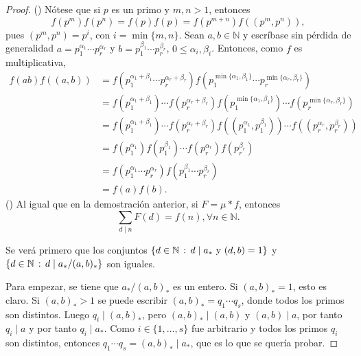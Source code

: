 \begin{proof}
(\textsc{}) Nótese que si $p$ es un primo y $m,n > 1$, entonces
\begin{equation*}
    f(p^m)f(p^n) = f(p) f(p) = f(p^{m+n})f((p^m,p^n)),
\end{equation*}
pues $(p^m,p^n)=p^i$, con $i=\min \{ m,n \}$. Sean $a,b \in \mathbb{N}$ y escríbase sin pérdida de generalidad $a=p_1^{\alpha_1} \cdots p_r^{\alpha_r}$ y $b=p_1^{\beta_1} \cdots p_r^{\beta_r}$, $0 \le \alpha_i, \beta_i$. Entonces, como $f$ es multiplicativa,
\begin{align*}
    f(a b)f((a,b)) &= f(p_1^{\alpha_1+\beta_1} \cdots p_r^{\alpha_r+\beta_r}) f(p_1^{\min \{ \alpha_1,\beta_1 \}} \cdots p_r^{\min \{ \alpha_r,\beta_r \}}) \\
                   &= f(p_1^{\alpha_1+\beta_1}) \cdots f(p_r^{\alpha_r+\beta_r}) f(p_1^{\min \{ \alpha_1,\beta_1 \}}) \cdots f(p_r^{\min \{ \alpha_r,\beta_r \}}) \\
                   &= f(p_1^{\alpha_1+\beta_1}) \cdots f(p_r^{\alpha_r+\beta_r}) f((p_1^{\alpha_1},p_1^{\beta_1})) \cdots f((p_r^{\alpha_r},p_r^{\beta_r})) \\
                   &= f(p_1^{\alpha_1})f(p_1^{\beta_1}) \cdots f(p_r^{\alpha_r})f(p_r^{\beta_r}) \\
                   &= f(p_1^{\alpha_1} \cdots p_r^{\alpha_r})f(p_1^{\beta_1} \cdots p_r^{\beta_r}) \\
                   &= f(a)f(b).
\end{align*}
(\textsc{}) Al igual que en la demostración anterior, si $F=\mu * f$, entonces
\begin{equation*}
    \sum_{d \mid n} F(d) = f(n), \forall n \in \mathbb{N}.
\end{equation*}

Se verá primero que los conjuntos $\{ d \in \mathbb{N} \, : \, d \mid a_* \text{ y } (d,b)=1\}$ y $\{ d \in \mathbb{N} \, : \, d \mid a_* / (a,b)_* \}$ son iguales.
\bigskip

Para empezar, se tiene que $a_*/(a,b)_*$ es un entero. Si $(a,b)_*=1$, esto es claro. Si $(a,b)_*>1$ se puede escribir $(a,b)_*=q_1 \cdots q_s$, donde todos los primos son distintos. Luego $q_i \mid (a,b)_*$, pero $(a,b)_* \mid (a,b)$ y $(a,b) \mid a$, por tanto $q_i \mid a$ y por tanto $q_i \mid a_*$. Como $i \in \{ 1,\ldots,s \}$ fue arbitrario y todos los primos $q_i$ son distintos, entonces $q_1 \cdots q_s = (a,b)_* \mid a_*$, que es lo que se quería probar.
\bigskip


\end{proof}
